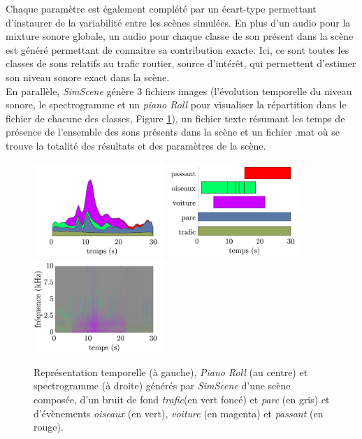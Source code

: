 Chaque paramètre est également complété par un écart-type permettant d'instaurer de la variabilité entre les scènes simulées. En plus d'un audio pour la mixture sonore globale, un audio pour chaque classe de son présent dans la scène est généré permettant de connaitre sa contribution exacte. Ici, ce sont toutes les classes de sons relatifs au trafic routier, source d'intérêt, qui permettent d'estimer son niveau sonore exact dans la scène.\\

En parallèle, \textit{SimScene} génère 3 fichiers images (l'évolution temporelle du niveau sonore, le spectrogramme et un \textit{piano Roll} pour visualiser la répartition dans le fichier de chacune des classes, Figure \ref{fig:somefiglabel}), un fichier texte résumant les temps de présence de l'ensemble des sons présents dans la scène et un fichier .mat où se trouve la totalité des résultats et des paramètres de la scène.\\



\begin{figure}[ht]
\includegraphics[width=5cm]{./figures/SimScene/exemple-timeDomain.pdf}\hfill
\includegraphics[width=5cm]{./figures/SimScene/exemple-pianoRoll.pdf}\hfill
\includegraphics[width=5cm]{./figures/SimScene/exemple-spectrum.pdf}
\caption{Représentation temporelle (à gauche), \textit{Piano Roll} (au centre) et spectrogramme (à droite) générés par \textit{SimScene} d'une scène composée, d'un bruit de fond \textit{trafic}(en vert foncé) et \textit{parc} (en gris) et d'évènements \textit{oiseaux} (en vert), \textit{voiture} (en magenta) et \textit{passant} (en rouge).}\label{fig:somefiglabel}
\end{figure}

